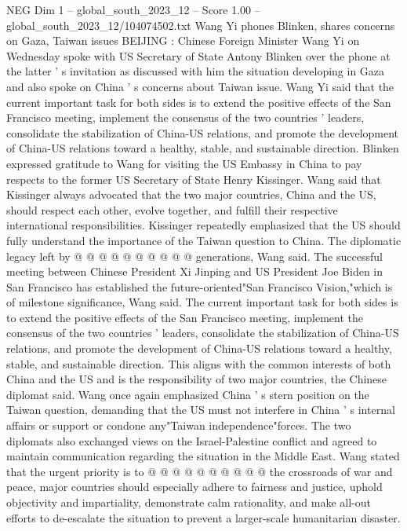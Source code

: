 \begin{textsample}{NEG Dim 1 – global\_south\_2023\_12 – Score 1.00 – global\_south\_2023\_12/104074502.txt}  \label{ex:f1_neg_410}
Wang Yi phones Blinken, shares concerns on Gaza, Taiwan issues BEIJING : Chinese Foreign Minister Wang Yi on Wednesday spoke with US Secretary of State Antony Blinken over the phone at the latter ' s invitation as discussed with him the situation developing in Gaza and also spoke on China ' s concerns about Taiwan issue.
Wang Yi said that the current important task for both sides is to extend the positive effects of the San Francisco meeting, implement the consensus of the two countries ' leaders, consolidate the stabilization of China-US relations, and promote the development of China-US relations toward a healthy, stable, and sustainable direction.
Blinken expressed gratitude to Wang for visiting the US Embassy in China to pay respects to the former US Secretary of State Henry Kissinger.
Wang said that Kissinger always advocated that the two major countries, China and the US, should respect each other, evolve together, and fulfill their respective international responsibilities.
Kissinger repeatedly emphasized that the US should fully understand the importance of the Taiwan question to China.
The diplomatic legacy left by @ @ @ @ @ @ @ @ @ @ generations, Wang said.
The successful meeting between Chinese President Xi Jinping and US President Joe Biden in San Francisco has established the future-oriented"San Francisco Vision,"which is of milestone significance, Wang said.
The current important task for both sides is to extend the positive effects of the San Francisco meeting, implement the consensus of the two countries ' leaders, consolidate the stabilization of China-US relations, and promote the development of China-US relations toward a healthy, stable, and sustainable direction.
This aligns with the common interests of both China and the US and is the responsibility of two major countries, the Chinese diplomat said.
Wang once again emphasized China ' s stern position on the Taiwan question, demanding that the US must not interfere in China ' s internal affairs or support or condone any"Taiwan independence"forces.
The two diplomats also exchanged views on the Israel-Palestine conflict and agreed to maintain communication regarding the situation in the Middle East.
Wang stated that the urgent priority is to @ @ @ @ @ @ @ @ @ @ the crossroads of war and peace, major countries should especially adhere to fairness and justice, uphold objectivity and impartiality, demonstrate calm rationality, and make all-out efforts to de-escalate the situation to prevent a larger-scale humanitarian disaster.

\end{textsample}
